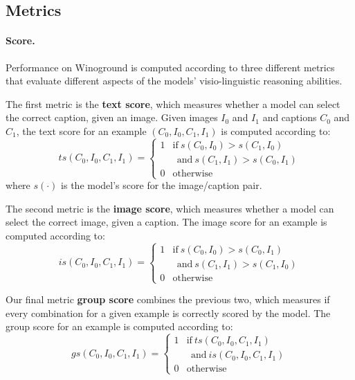 \subsection{Metrics}

\paragraph{Score.}
Performance on Winoground \cite{thrush2022winoground} is computed according to three different metrics that evaluate different aspects of the models' visio-linguistic reasoning abilities.

The first metric is the \textbf{text score}, which measures whether a model can select the correct caption, given an image. 
Given images $I_0$ and $I_{1}$ and captions $C_{0}$ and $C_{1}$, the text score for an example $(C_{0},I_{0},C_{1},I_{1})$ is computed according to:
\begin{equation}\label{eq:text-score}
        ts(C_{0},I_{0},C_{1},I_{1})= 
    \begin{cases}
        1 & \text{if}\  s(C_{0}, I_{0}) > s(C_{1}, I_{0}) \\
        & \ \ \text{and}\ s(C_{1}, I_{1}) > s(C_{0}, I_{1}) \\
        0              & \text{otherwise}
    \end{cases}
\end{equation}
where $s(\cdot)$ is the model's score for the image/caption pair.

The second metric is the \textbf{image score}, which measures whether a model can select the correct image, given a caption.
The image score for an example is computed according to:
\begin{equation}\label{eq:image-score}
        is(C_{0},I_{0},C_{1},I_{1})= 
    \begin{cases}
        1 & \text{if}\  s(C_{0}, I_{0}) > s(C_{0}, I_{1})\\
        & \ \ \text{and}\ s(C_{1}, I_{1}) > s(C_{1}, I_{0}) \\
        0              & \text{otherwise}
    \end{cases}
\end{equation}

Our final metric \textbf{group score} combines the previous two, which measures if every combination for a given example is correctly scored by the model.
The group score for an example is computed according to:
\begin{equation}\label{eq:group-score}
        gs(C_{0},I_{0},C_{1},I_{1})= 
    \begin{cases}
        1 & \text{if}\  ts(C_{0},I_{0},C_{1},I_{1})  \\
         & \ \ \text{and}\ is(C_{0},I_{0},C_{1},I_{1})\\
        0              & \text{otherwise}
    \end{cases}
\end{equation}

